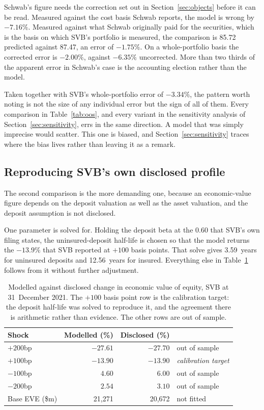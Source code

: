 Schwab's figure needs the correction set out in Section~\ref{sec:objects} before it
can be read. Measured against the cost basis Schwab reports, the model is wrong by
$-7.16\%$. Measured against what Schwab originally paid for the securities, which is
the basis on which SVB's portfolio is measured, the comparison is 85.72 predicted
against 87.47, an error of $-1.75\%$. On a whole-portfolio basis the corrected error
is $-2.00\%$, against $-6.35\%$ uncorrected. More than two thirds of the apparent
error in Schwab's case is the accounting election rather than the model.

Taken together with SVB's whole-portfolio error of $-3.34\%$, the pattern worth
noting is not the size of any individual error but the sign of all of them. Every
comparison in Table~\ref{tab:oos}, and every variant in the sensitivity analysis of
Section~\ref{sec:sensitivity}, errs in the same direction. A model that was simply
imprecise would scatter. This one is biased, and
Section~\ref{sec:sensitivity} traces where the bias lives rather than leaving it as
a remark.

\subsection{Reproducing SVB's own disclosed profile}

The second comparison is the more demanding one, because an economic-value figure
depends on the deposit valuation as well as the asset valuation, and the deposit
assumption is not disclosed.

One parameter is solved for. Holding the deposit beta at the 0.60 that SVB's own
filing states, the uninsured-deposit half-life is chosen so that the model returns
the $-13.9\%$ that SVB reported at $+100$ basis points. That solve gives 3.59~years
for uninsured deposits and 12.56~years for insured. Everything else in
Table~\ref{tab:profile} follows from it without further adjustment.

\begin{table}[htbp]
\centering
\caption{Modelled against disclosed change in economic value of equity, SVB at
31~December 2021. The $+100$ basis point row is the calibration target: the deposit
half-life was solved to reproduce it, and the agreement there is arithmetic rather
than evidence. The other rows are out of sample.}
\label{tab:profile}
\small
\begin{tabular}{lrrl}
\toprule
Shock & Modelled (\%) & Disclosed (\%) & \\
\midrule
$+200$bp & $-27.61$ & $-27.70$ & out of sample \\
$+100$bp & $-13.90$ & $-13.90$ & \textit{calibration target} \\
$-100$bp & $4.60$   & $6.00$   & out of sample \\
$-200$bp & $2.54$   & $3.10$   & out of sample \\
\midrule
Base EVE (\$m) & 21,271 & 20,672 & not fitted \\
\bottomrule
\end{tabular}
\end{table}

